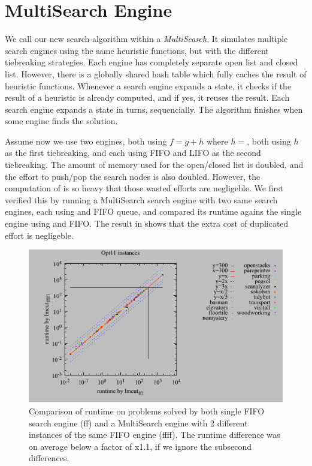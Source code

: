 \section{MultiSearch Engine}

We call our new search algorithm within \astar a \emph{MultiSearch}.
It simulates multiple search engines using the same heuristic functions,
but with the different tiebreaking strategies.  Each engine has completely
separate open list and closed list.  However, there is a
globally shared hash table which fully caches the result of heuristic
functions.  Whenever a search engine expands a state, it checks if the
result of a heuristic is already computed, and if yes, it reuses the
result.  Each search engine expands a state in turns, sequencially. The algorithm
finishes when some engine finds the solution.

Assume now we use two \astar engines, both using $f=g+h$ where $h=$\lmcut, both using $h$ as the first tiebreaking, and each using FIFO and LIFO as the second tiebreaking.
The amount of memory used for the open/closed list is doubled, and the effort to push/pop the search nodes is also doubled.
However, the computation of \lmcut is so heavy that those wasted efforts are negligeble.
We first verified this by running a MultiSearch search engine with two same search engines, each using \lmcut and FIFO queue, and compared its runtime agains the single engine using \lmcut and FIFO. The result in  shows that the extra cost of duplicated effort is negligeble.

\begin{figure}[htbp]
 \centering
 \includegraphics{tables/opt11-time-lmcut_ff-lmcut_ffff.pdf}
 \caption{Comparison of runtime on problems solved by both single FIFO search engine (ff) and a MultiSearch engine with 2 different instances of the same FIFO engine (ffff). The runtime difference was on average below a factor of x1.1, if we ignore the subsecond differences.}
 \label{ffff}
\end{figure}

